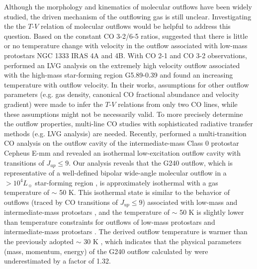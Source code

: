 Although the morphology and kinematics of molecular outflows have been widely studied, the driven mechanism of the outflowing gas is still unclear. Investigating the the $T$-$V$ relation of molecular outflows would be helpful to address this question. Based on the constant CO 3-2/6-5 ratios, \citet{2012A&A...542A..86Y} suggested that there is little or no temperature change with velocity in the outflow associated with low-mass protostars NGC 1333 IRAS 4A and 4B. With CO 2-1 and CO 3-2 observations, \citet{2012ApJ...744L..26S} performed an LVG analysis on the extremely high velocity outflow associated with the high-mass star-forming region G5.89-0.39 and found an increasing temperature with outflow velocity. In their works, assumptions for other outflow parameters (e.g. gas density, canonical CO fractional abundance and velocity gradient) were made to infer the $T$-$V$ relations from only two CO lines, while these assumptions might not be necessarily valid. To more precisely determine the outflow properties, multi-line CO studies with sophisticated radiative transfer methods (e.g. LVG analysis) are needed. Recently, \citet{2015A&A...581A...4L} performed a multi-transition CO analysis on the outflow cavity of the intermediate-mass Class 0 protostar Cepheus E-mm and revealed an isothermal low-excitation outflow cavity with transitions of $J_{up} \le 9$. Our analysis reveals that the G240 outflow, which is representative of a well-defined bipolar wide-angle molecular outflow in a $> 10^4 L_\sun$ star-forming region \citep{2009ApJ...696...66Q}, is approximately isothermal with a gas temperature of $\sim$ 50 K. This isothermal state is similar to the behavior of outflows (traced by CO transitions of $J_{up} \le 9$) associated with low-mass and intermediate-mass protostars \citep{2012A&A...542A..86Y, 2015A&A...581A...4L}, and the temperature of $\sim$ 50 K is slightly lower than temperature constraints for outflows of low-mass protostars \citep{2009A&A...501..633V, 2012A&A...542A..86Y} and intermediate-mass protostars \citep{2016A&A...587A..17V}. The derived outflow temperature is warmer than the previously adopted $\sim$ 30 K \citep{2009ApJ...696...66Q}, which indicates that the physical parameters (mass, momentum, energy) of the G240 outflow calculated by \citet{2009ApJ...696...66Q} were underestimated by a factor of 1.32. 


